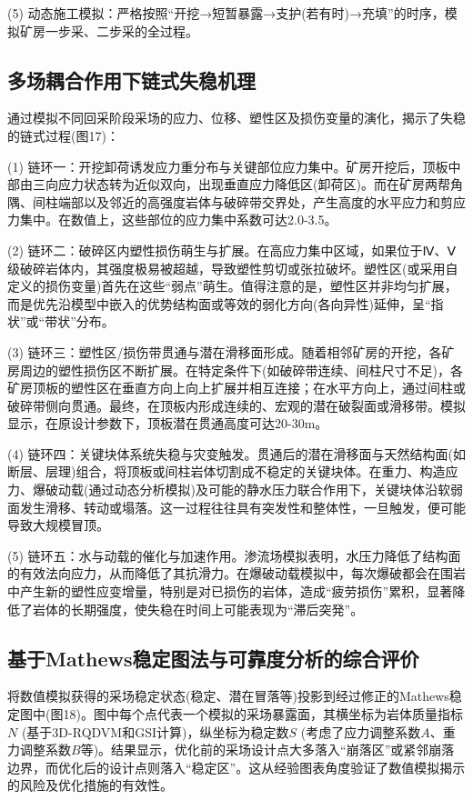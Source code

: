 \documentclass[twocolumn,a4paper,10pt]{article}
\begin{document}
(5) 动态施工模拟：严格按照“开挖→短暂暴露→支护(若有时)→充填”的时序，模拟矿房一步采、二步采的全过程。

\subsection{多场耦合作用下链式失稳机理}
通过模拟不同回采阶段采场的应力、位移、塑性区及损伤变量的演化，揭示了失稳的链式过程(图17)：

(1) 链环一：开挖卸荷诱发应力重分布与关键部位应力集中。矿房开挖后，顶板中部由三向应力状态转为近似双向，出现垂直应力降低区(卸荷区)。而在矿房两帮角隅、间柱端部以及邻近的高强度岩体与破碎带交界处，产生高度的水平应力和剪应力集中。在数值上，这些部位的应力集中系数可达2.0-3.5。

(2) 链环二：破碎区内塑性损伤萌生与扩展。在高应力集中区域，如果位于Ⅳ、Ⅴ级破碎岩体内，其强度极易被超越，导致塑性剪切或张拉破坏。塑性区(或采用自定义的损伤变量)首先在这些“弱点”萌生。值得注意的是，塑性区并非均匀扩展，而是优先沿模型中嵌入的优势结构面或等效的弱化方向(各向异性)延伸，呈“指状”或“带状”分布。

(3) 链环三：塑性区/损伤带贯通与潜在滑移面形成。随着相邻矿房的开挖，各矿房周边的塑性损伤区不断扩展。在特定条件下(如破碎带连续、间柱尺寸不足)，各矿房顶板的塑性区在垂直方向上向上扩展并相互连接；在水平方向上，通过间柱或破碎带侧向贯通。最终，在顶板内形成连续的、宏观的潜在破裂面或滑移带。模拟显示，在原设计参数下，顶板潜在贯通高度可达20-30m。

(4) 链环四：关键块体系统失稳与灾变触发。贯通后的潜在滑移面与天然结构面(如断层、层理)组合，将顶板或间柱岩体切割成不稳定的关键块体。在重力、构造应力、爆破动载(通过动态分析模拟)及可能的静水压力联合作用下，关键块体沿软弱面发生滑移、转动或塌落。这一过程往往具有突发性和整体性，一旦触发，便可能导致大规模冒顶。

(5) 链环五：水与动载的催化与加速作用。渗流场模拟表明，水压力降低了结构面的有效法向应力，从而降低了其抗滑力。在爆破动载模拟中，每次爆破都会在围岩中产生新的塑性应变增量，特别是对已损伤的岩体，造成“疲劳损伤”累积，显著降低了岩体的长期强度，使失稳在时间上可能表现为“滞后突発”。

\subsection{基于Mathews稳定图法与可靠度分析的综合评价}
将数值模拟获得的采场稳定状态(稳定、潜在冒落等)投影到经过修正的Mathews稳定图中(图18)。图中每个点代表一个模拟的采场暴露面，其横坐标为岩体质量指标$N$ (基于3D-RQDVM和GSI计算)，纵坐标为稳定数$S$ (考虑了应力调整系数$A$、重力调整系数$B$等)。结果显示，优化前的采场设计点大多落入“崩落区”或紧邻崩落边界，而优化后的设计点则落入“稳定区”。这从经验图表角度验证了数值模拟揭示的风险及优化措施的有效性。
\end{document}
